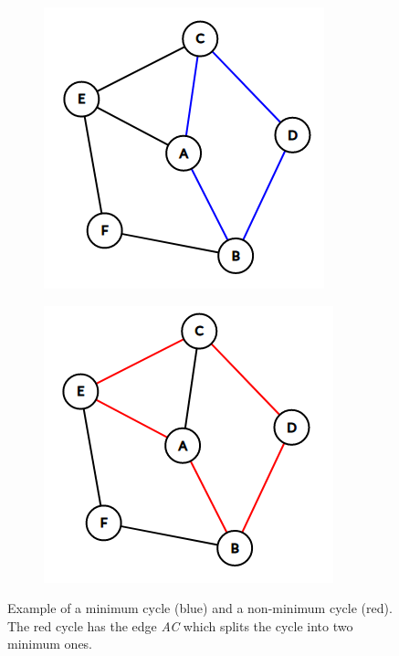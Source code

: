 \begin{figure}[h!]
  \centering
  \begin{subfigure}[b]{0.3\textwidth}
    \includegraphics[width=\textwidth]{figure/blockgen1.png}
  \end{subfigure}
  \begin{subfigure}[b]{0.3\textwidth}
    \includegraphics[width=\textwidth]{figure/blockgen2.png}
  \end{subfigure}

  \caption{Example of a minimum cycle (blue) and a non-minimum cycle (red). The red cycle has the edge \textit{AC} which splits the cycle into two minimum ones.}
  \label{fig:graph_cycles}
\end{figure}

